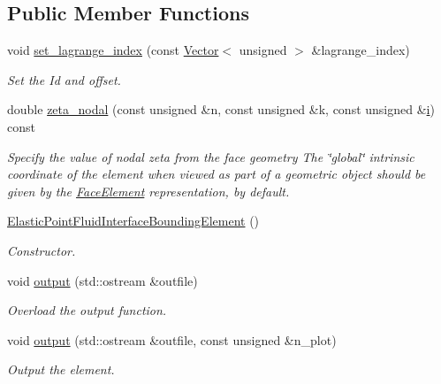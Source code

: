 \subsection*{Public Member Functions}
\begin{DoxyCompactItemize}
\item 
void \hyperlink{classoomph_1_1ElasticPointFluidInterfaceBoundingElement_a9a36ac6e616ed271507cbfe26de085b4}{set\+\_\+lagrange\+\_\+index} (const \hyperlink{classoomph_1_1Vector}{Vector}$<$ unsigned $>$ \&lagrange\+\_\+index)
\begin{DoxyCompactList}\small\item\em Set the Id and offset. \end{DoxyCompactList}\item 
double \hyperlink{classoomph_1_1ElasticPointFluidInterfaceBoundingElement_a9d72fee284b866769347fb471c5828ad}{zeta\+\_\+nodal} (const unsigned \&n, const unsigned \&k, const unsigned \&\hyperlink{cfortran_8h_adb50e893b86b3e55e751a42eab3cba82}{i}) const
\begin{DoxyCompactList}\small\item\em Specify the value of nodal zeta from the face geometry The \char`\"{}global\char`\"{} intrinsic coordinate of the element when viewed as part of a geometric object should be given by the \hyperlink{classoomph_1_1FaceElement}{Face\+Element} representation, by default. \end{DoxyCompactList}\item 
\hyperlink{classoomph_1_1ElasticPointFluidInterfaceBoundingElement_a18e40e63a31953ad02cb0a2e7d0577b3}{Elastic\+Point\+Fluid\+Interface\+Bounding\+Element} ()
\begin{DoxyCompactList}\small\item\em Constructor. \end{DoxyCompactList}\item 
void \hyperlink{classoomph_1_1ElasticPointFluidInterfaceBoundingElement_a3a09e94ba3bf5ce0922bc4b75097078c}{output} (std\+::ostream \&outfile)
\begin{DoxyCompactList}\small\item\em Overload the output function. \end{DoxyCompactList}\item 
void \hyperlink{classoomph_1_1ElasticPointFluidInterfaceBoundingElement_a20c0678a9fdd6ef91fe48aa1b9209c38}{output} (std\+::ostream \&outfile, const unsigned \&n\+\_\+plot)
\begin{DoxyCompactList}\small\item\em Output the element. \end{DoxyCompactList}\item 

\end{DoxyCompactItemize}
